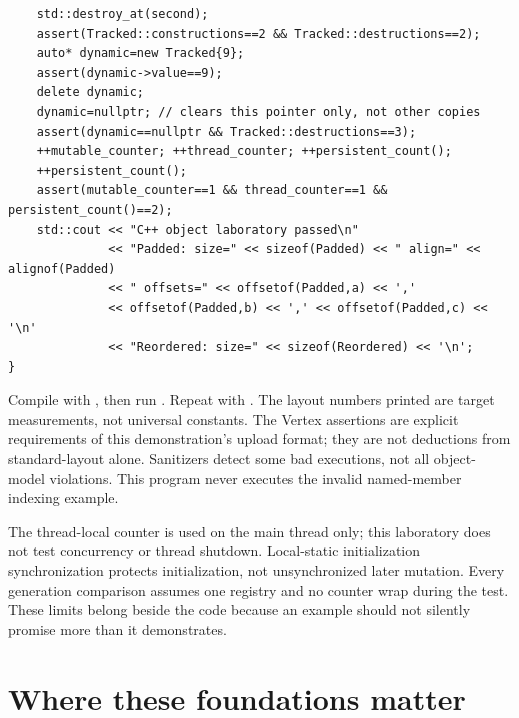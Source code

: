 \begin{verbatim}
    std::destroy_at(second);
    assert(Tracked::constructions==2 && Tracked::destructions==2);
    auto* dynamic=new Tracked{9};
    assert(dynamic->value==9);
    delete dynamic;
    dynamic=nullptr; // clears this pointer only, not other copies
    assert(dynamic==nullptr && Tracked::destructions==3);
    ++mutable_counter; ++thread_counter; ++persistent_count();
    ++persistent_count();
    assert(mutable_counter==1 && thread_counter==1 && persistent_count()==2);
    std::cout << "C++ object laboratory passed\n"
              << "Padded: size=" << sizeof(Padded) << " align=" << alignof(Padded)
              << " offsets=" << offsetof(Padded,a) << ','
              << offsetof(Padded,b) << ',' << offsetof(Padded,c) << '\n'
              << "Reordered: size=" << sizeof(Reordered) << '\n';
}
\end{verbatim}

Compile with , then run . Repeat with . The layout numbers printed are target measurements, not universal constants. The Vertex assertions are explicit requirements of this demonstration's upload format; they are not deductions from standard-layout alone. Sanitizers detect some bad executions, not all object-model violations. This program never executes the invalid named-member indexing example.

The thread-local counter is used on the main thread only; this laboratory does not test concurrency or thread shutdown. Local-static initialization synchronization protects initialization, not unsynchronized later mutation. Every generation comparison assumes one registry and no counter wrap during the test. These limits belong beside the code because an example should not silently promise more than it demonstrates.

\section{Where these foundations matter}\label{01-foundations-i-ch004-where-these-foundations-matter}

